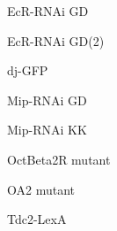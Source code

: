 \documentclass[17pt]{extarticle}
\begin{document}
\footnotesize
\vspace*{\fill}
\newpage{}
\vspace*{\fill}\begin{normalsize}
EcR-RNAi GD \\[0.5em]
\end{normalsize}
\footnotesize
\vspace*{\fill}
\newpage{}
\vspace*{\fill}\begin{normalsize}
EcR-RNAi GD(2) \\[0.5em]
\end{normalsize}
\footnotesize
\vspace*{\fill}
\newpage{}
\vspace*{\fill}\begin{large}
dj-GFP \\[0.5em]
\end{large}
\footnotesize
\vspace*{\fill}
\newpage{}
\vspace*{\fill}\begin{normalsize}
Mip-RNAi GD \\[0.5em]
\end{normalsize}
\footnotesize
\vspace*{\fill}
\newpage{}
\vspace*{\fill}\begin{normalsize}
Mip-RNAi KK \\[0.5em]
\end{normalsize}
\footnotesize
\vspace*{\fill}
\newpage{}
\vspace*{\fill}\begin{small}
OctBeta2R mutant \\[0.5em]
\end{small}
\footnotesize
\vspace*{\fill}
\newpage{}
\vspace*{\fill}\begin{large}
OA2 mutant \\[0.5em]
\end{large}
\footnotesize
\vspace*{\fill}
\newpage{}
\vspace*{\fill}\begin{large}
Tdc2-LexA \\[0.5em]
\end{large}
\footnotesize
\vspace*{\fill}
\end{document}

